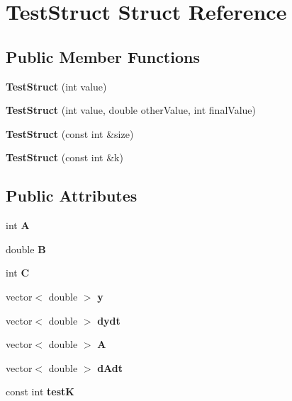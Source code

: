 \hypertarget{a00802}{}\section{Test\+Struct Struct Reference}
\label{a00802}
\subsection*{Public Member Functions}
\begin{DoxyCompactItemize}
\item 
\mbox{\label{a00802_ad1b28d11092e7dcf1818901f7a276120}} 
{\bfseries Test\+Struct} (int value)
\item 
\mbox{\label{a00802_a61a16418491afb7b2b6632bfad50bf19}} 
{\bfseries Test\+Struct} (int value, double other\+Value, int final\+Value)
\item 
\mbox{\label{a00802_a8412477af743046299fd5601f7f8f2eb}} 
{\bfseries Test\+Struct} (const int \&size)
\item 
\mbox{\label{a00802_a7029a4d7bbcdaa0e61584c1d7254f180}} 
{\bfseries Test\+Struct} (const int \&k)
\end{DoxyCompactItemize}
\subsection*{Public Attributes}
\begin{DoxyCompactItemize}
\item 
\mbox{\label{a00802_a948fae89410671cffc8087f752a45552}} 
int {\bfseries A}
\item 
\mbox{\label{a00802_a66fcfc799008c9b706ec74e38a0be986}} 
double {\bfseries B}
\item 
\mbox{\label{a00802_acb102a7a7fa5b375d57174a94009cce0}} 
int {\bfseries C}
\item 
\mbox{\label{a00802_aae56de0497ced1edb830e740a40b2231}} 
vector$<$ double $>$ {\bfseries y}
\item 
\mbox{\label{a00802_a5b11f70cd90a4f65c27d9e281687fbe7}} 
vector$<$ double $>$ {\bfseries dydt}
\item 
\mbox{\label{a00802_a3ed022292ebcbe2129a129ebf5ce6967}} 
vector$<$ double $>$ {\bfseries A}
\item 
\mbox{\label{a00802_a8966125f7bccdd7050b609df475ed21c}} 
vector$<$ double $>$ {\bfseries d\+Adt}
\item 
\mbox{\label{a00802_a4d85a6094ad40393113b2eede98af02c}} 
const int {\bfseries testK}
\end{DoxyCompactItemize}


